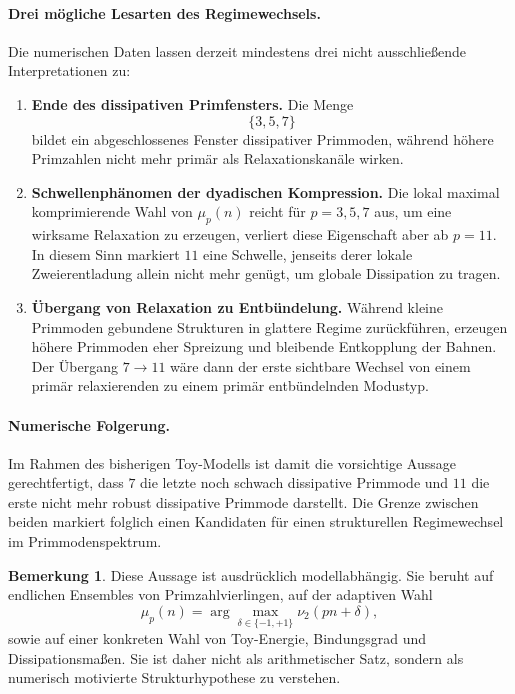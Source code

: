 \documentclass[11pt,a4paper]{article}
\theoremstyle{definition}
\newtheorem{bemerkung}{Bemerkung}
\begin{document}
\paragraph{Drei mögliche Lesarten des Regimewechsels.}
Die numerischen Daten lassen derzeit mindestens drei nicht ausschließende Interpretationen zu:

\begin{enumerate}
	\item \textbf{Ende des dissipativen Primfensters.}
	Die Menge
	\[
	\{3,5,7\}
	\]
	bildet ein abgeschlossenes Fenster dissipativer Primmoden, während höhere Primzahlen nicht mehr primär als Relaxationskanäle wirken.
	
	\item \textbf{Schwellenphänomen der dyadischen Kompression.}
	Die lokal maximal komprimierende Wahl von \(\mu_p(n)\) reicht für \(p=3,5,7\) aus, um eine wirksame Relaxation zu erzeugen, verliert diese Eigenschaft aber ab \(p=11\). In diesem Sinn markiert \(11\) eine Schwelle, jenseits derer lokale Zweierentladung allein nicht mehr genügt, um globale Dissipation zu tragen.
	
	\item \textbf{Übergang von Relaxation zu Entbündelung.}
	Während kleine Primmoden gebundene Strukturen in glattere Regime zurückführen, erzeugen höhere Primmoden eher Spreizung und bleibende Entkopplung der Bahnen. Der Übergang \(7\to 11\) wäre dann der erste sichtbare Wechsel von einem primär relaxierenden zu einem primär entbündelnden Modustyp.
\end{enumerate}

\paragraph{Numerische Folgerung.}
Im Rahmen des bisherigen Toy-Modells ist damit die vorsichtige Aussage gerechtfertigt, dass \(7\) die letzte noch schwach dissipative Primmode und \(11\) die erste nicht mehr robust dissipative Primmode darstellt. Die Grenze zwischen beiden markiert folglich einen Kandidaten für einen strukturellen Regimewechsel im Primmodenspektrum.

\begin{bemerkung}
	Diese Aussage ist ausdrücklich modellabhängig. Sie beruht auf endlichen Ensembles von Primzahlvierlingen, auf der adaptiven Wahl
	\[
	\mu_p(n)=\arg\max_{\delta\in\{-1,+1\}}\nu_2(pn+\delta),
	\]
	sowie auf einer konkreten Wahl von Toy-Energie, Bindungsgrad und Dissipationsmaßen. Sie ist daher nicht als arithmetischer Satz, sondern als numerisch motivierte Strukturhypothese zu verstehen.
\end{bemerkung}
\end{document}

